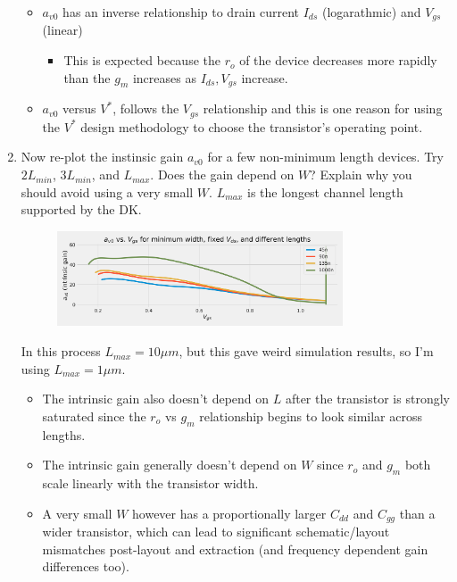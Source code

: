 \begin{enumerate}
    \begin{itemize}
        \item $a_{v0}$ has an inverse relationship to drain current $I_{ds}$ (logarathmic) and $V_{gs}$ (linear)
        \begin{itemize}
            \item This is expected because the $r_o$ of the device decreases more rapidly than the $g_m$ increases as $I_{ds}, V_{gs}$ increase.
        \end{itemize}
        \item $a_{v0}$ versus $V^*$, follows the $V_{gs}$ relationship and this is one reason for using the $V^*$ design methodology to choose the transistor's operating point.
    \end{itemize}

\item {\color{blue}Now re-plot the instinsic gain $a_{v0}$ for a few non-minimum length devices. Try $2 L_{min}$, $3 L_{min}$, and $L_{max}$. Does the gain depend on $W$? Explain why you should avoid using a very small $W$. $L_{max}$ is the longest channel length supported by the DK.}

    \begin{figure}[H]
        \centering
        \includegraphics[width=0.8\textwidth]{figs/problem5.png}
    \end{figure}

    In this process $L_{max} = 10 \mu m$, but this gave weird simulation results, so I'm using $L_{max} = 1 \mu m$.
    \begin{itemize}
        \item The intrinsic gain also doesn't depend on $L$ after the transistor is strongly saturated since the $r_o$ vs $g_m$ relationship begins to look similar across lengths.
        \item The intrinsic gain generally doesn't depend on $W$ since $r_o$ and $g_m$ both scale linearly with the transistor width.
        \item A very small $W$ however has a proportionally larger $C_{dd}$ and $C_{gg}$ than a wider transistor, which can lead to significant schematic/layout mismatches post-layout and extraction (and frequency dependent gain differences too).
    \end{itemize}


\end{enumerate}
